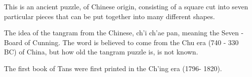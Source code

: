 This is an ancient puzzle, of Chinese origin, consisting of a square cut into seven 
particular pieces that can be put together into many different shapes.

\par
The idea of the tangram from the Chinese, ch'i ch'ae pan, meaning the Seven 
- Board of Cunning.  
The word is believed to come from the Chu era (740 - 330 BC) of China, but how old the 
tangram puzzle is, is not known. 

\par
The first book of Tans were first printed in the Ch'ing era (1796- 1820).